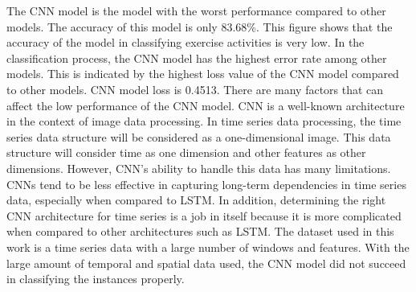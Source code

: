 The CNN model is the model with the worst performance compared to other models. The accuracy of this model is only 83.68\%. This figure shows that the accuracy of the model in classifying exercise activities is very low. In the classification process, the CNN model has the highest error rate among other models. This is indicated by the highest loss value of the CNN model compared to other models. CNN model loss is 0.4513. There are many factors that can affect the low performance of the CNN model. CNN is a well-known architecture in the context of image data processing. In time series data processing, the time series data structure will be considered as a one-dimensional image. This data structure will consider time as one dimension and other features as other dimensions. However, CNN's ability to handle this data has many limitations. CNNs tend to be less effective in capturing long-term dependencies in time series data, especially when compared to LSTM. In addition, determining the right CNN architecture for time series is a job in itself because it is more complicated when compared to other architectures such as LSTM. The dataset used in this work is a time series data with a large number of windows and features. With the large amount of temporal and spatial data used, the CNN model did not succeed in classifying the instances properly.

